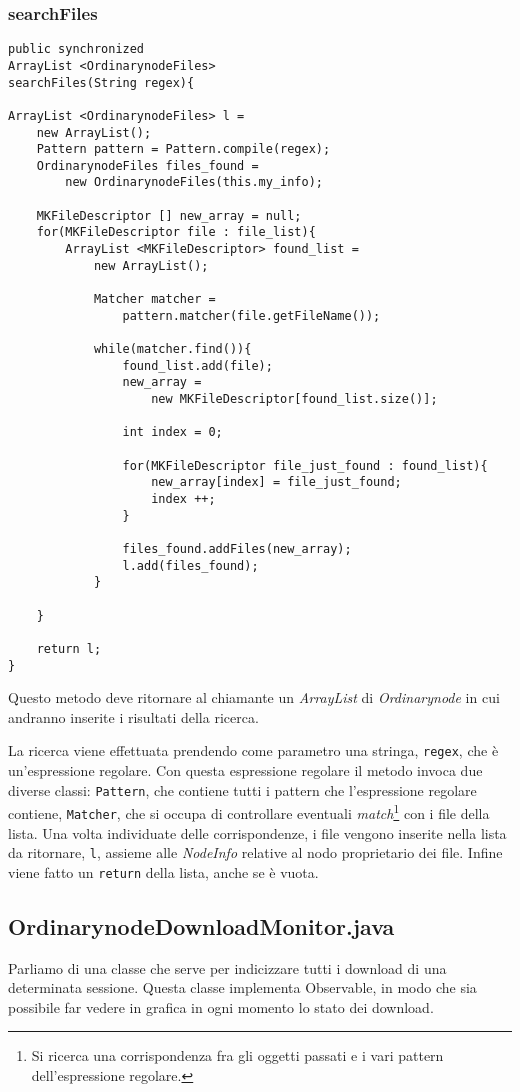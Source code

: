 \subsubsection{searchFiles}
\begin{lstlisting}
public synchronized 
ArrayList <OrdinarynodeFiles> 
searchFiles(String regex){

ArrayList <OrdinarynodeFiles> l = 
	new ArrayList();
	Pattern pattern = Pattern.compile(regex);
	OrdinarynodeFiles files_found = 
		new OrdinarynodeFiles(this.my_info);

	MKFileDescriptor [] new_array = null;
	for(MKFileDescriptor file : file_list){
		ArrayList <MKFileDescriptor> found_list = 
			new ArrayList();

			Matcher matcher = 
				pattern.matcher(file.getFileName());

			while(matcher.find()){
				found_list.add(file);
				new_array = 
					new MKFileDescriptor[found_list.size()];
				
				int index = 0;
				
				for(MKFileDescriptor file_just_found : found_list){
					new_array[index] = file_just_found;
					index ++;
				}
				
				files_found.addFiles(new_array);
				l.add(files_found);
			}

	}
	
	return l;
}
\end{lstlisting}
Questo metodo deve ritornare al chiamante un \emph{ArrayList} di \emph{Ordinarynode} in cui andranno inserite i risultati della ricerca.
 
La ricerca viene effettuata prendendo come parametro una stringa, \verb|regex|, che è un'espressione regolare.
Con questa espressione regolare il metodo invoca due diverse classi: \verb|Pattern|, che contiene tutti i pattern che l'espressione regolare contiene, \verb|Matcher|, che si occupa di controllare eventuali \emph{match}\footnote{Si ricerca una corrispondenza fra gli oggetti passati e i vari pattern dell'espressione regolare.} con i file della lista.
Una volta individuate delle corrispondenze, i file vengono inserite nella lista da ritornare, \verb|l|, assieme alle \emph{NodeInfo} relative al nodo proprietario dei file.
Infine viene fatto un \verb|return| della lista, anche se è vuota.

\subsection{OrdinarynodeDownloadMonitor.java}
Parliamo di una classe che serve per indicizzare tutti i download di una determinata sessione.
Questa classe implementa Observable, in modo che sia possibile far vedere in grafica in ogni momento lo stato dei download.


